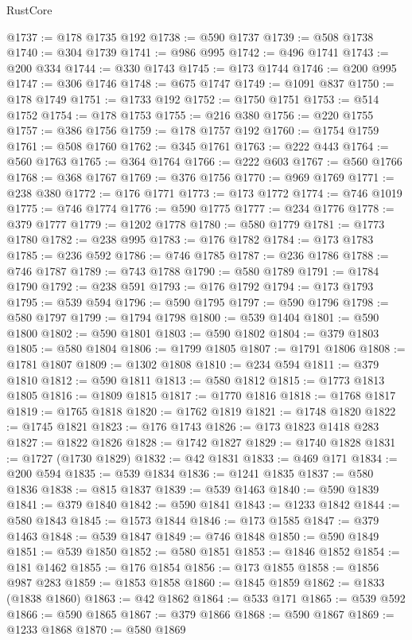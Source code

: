 \begin{lexlean}{RustCore}
\begin{coremodule}
@1737 := @178 @1735 @192
@1738 := @590 @1737
@1739 := @508 @1738
@1740 := @304 @1739
@1741 := @986 @995
@1742 := @496 @1741
@1743 := @200 @334
@1744 := @330 @1743
@1745 := @173 @1744
@1746 := @200 @995
@1747 := @306 @1746
@1748 := @675 @1747
@1749 := @1091 @837
@1750 := @178 @1749
@1751 := @1733 @192
@1752 := @1750 @1751
@1753 := @514 @1752
@1754 := @178 @1753
@1755 := @216 @380
@1756 := @220 @1755
@1757 := @386 @1756
@1759 := @178 @1757 @192
@1760 := @1754 @1759
@1761 := @508 @1760
@1762 := @345 @1761
@1763 := @222 @443
@1764 := @560 @1763
@1765 := @364 @1764
@1766 := @222 @603
@1767 := @560 @1766
@1768 := @368 @1767
@1769 := @376 @1756
@1770 := @969 @1769
@1771 := @238 @380
@1772 := @176 @1771
@1773 := @173 @1772
@1774 := @746 @1019
@1775 := @746 @1774
@1776 := @590 @1775
@1777 := @234 @1776
@1778 := @379 @1777
@1779 := @1202 @1778
@1780 := @580 @1779
@1781 := @1773 @1780
@1782 := @238 @995
@1783 := @176 @1782
@1784 := @173 @1783
@1785 := @236 @592
@1786 := @746 @1785
@1787 := @236 @1786
@1788 := @746 @1787
@1789 := @743 @1788
@1790 := @580 @1789
@1791 := @1784 @1790
@1792 := @238 @591
@1793 := @176 @1792
@1794 := @173 @1793
@1795 := @539 @594
@1796 := @590 @1795
@1797 := @590 @1796
@1798 := @580 @1797
@1799 := @1794 @1798
@1800 := @539 @1404
@1801 := @590 @1800
@1802 := @590 @1801
@1803 := @590 @1802
@1804 := @379 @1803
@1805 := @580 @1804
@1806 := @1799 @1805
@1807 := @1791 @1806
@1808 := @1781 @1807
@1809 := @1302 @1808
@1810 := @234 @594
@1811 := @379 @1810
@1812 := @590 @1811
@1813 := @580 @1812
@1815 := @1773 @1813 @1805
@1816 := @1809 @1815
@1817 := @1770 @1816
@1818 := @1768 @1817
@1819 := @1765 @1818
@1820 := @1762 @1819
@1821 := @1748 @1820
@1822 := @1745 @1821
@1823 := @176 @1743
@1826 := @173 @1823 @1418 @283
@1827 := @1822 @1826
@1828 := @1742 @1827
@1829 := @1740 @1828
@1831 := @1727 (@1730 @1829)
@1832 := @42 @1831
@1833 := @469 @171
@1834 := @200 @594
@1835 := @539 @1834
@1836 := @1241 @1835
@1837 := @580 @1836
@1838 := @815 @1837
@1839 := @539 @1463
@1840 := @590 @1839
@1841 := @379 @1840
@1842 := @590 @1841
@1843 := @1233 @1842
@1844 := @580 @1843
@1845 := @1573 @1844
@1846 := @173 @1585
@1847 := @379 @1463
@1848 := @539 @1847
@1849 := @746 @1848
@1850 := @590 @1849
@1851 := @539 @1850
@1852 := @580 @1851
@1853 := @1846 @1852
@1854 := @181 @1462
@1855 := @176 @1854
@1856 := @173 @1855
@1858 := @1856 @987 @283
@1859 := @1853 @1858
@1860 := @1845 @1859
@1862 := @1833 (@1838 @1860)
@1863 := @42 @1862
@1864 := @533 @171
@1865 := @539 @592
@1866 := @590 @1865
@1867 := @379 @1866
@1868 := @590 @1867
@1869 := @1233 @1868
@1870 := @580 @1869

\end{coremodule}
\end{lexlean}
